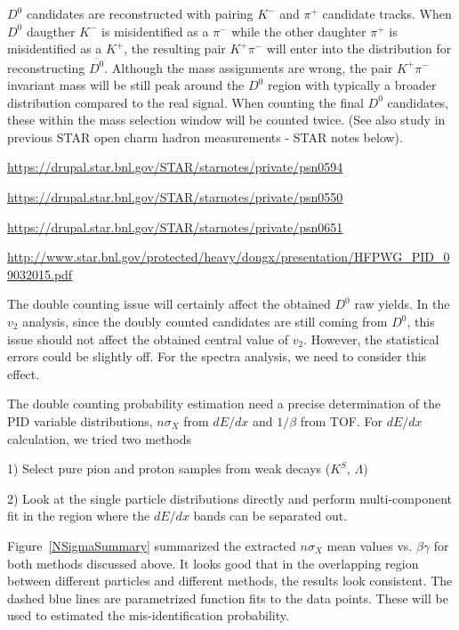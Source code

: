 $D^0$ candidates are reconstructed with pairing $K^-$ and $\pi^+$ candidate tracks. When $D^0$ daugther $K^-$ is misidentified as a $\pi^-$ while the other daughter $\pi^+$ is misidentified as a $K^+$, the resulting pair $K^+\pi^-$ will enter into the distribution for reconstructing $\overline{D^0}$. Although the mass assignments are wrong, the pair $K^+\pi^-$ invariant mass will be still peak around the $D^0$ region with typically a broader distribution compared to the real signal. When counting the final $D^0$ candidates, these within the mass selection window will be counted twice. (See also study in previous STAR open charm hadron measurements - STAR notes below).

\url{https://drupal.star.bnl.gov/STAR/starnotes/private/psn0594}

\url{https://drupal.star.bnl.gov/STAR/starnotes/private/psn0550}

\url{https://drupal.star.bnl.gov/STAR/starnotes/private/psn0651}

\url{http://www.star.bnl.gov/protected/heavy/dongx/presentation/HFPWG_PID_09032015.pdf}

The double counting issue will certainly affect the obtained $D^0$ raw yields. In the $v_2$ analysis, since the doubly counted candidates are still coming from $D^0$, this issue should not affect the obtained central value of $v_2$. However, the statistical errors could be slightly off. For the spectra analysis, we need to consider this effect.

The double counting probability estimation need a precise determination of the PID variable distributions, $n\sigma_X$ from $dE/dx$ and $1/\beta$ from TOF. For $dE/dx$ calculation, we tried two methods

1) Select pure pion and proton samples from weak decays ($K^{S}$, $\Lambda$)

2) Look at the single particle distributions directly and perform multi-component fit in the region where the $dE/dx$ bands can be separated out.

Figure~\ref{NSigmaSummary} summarized the extracted $n\sigma_{X}$ mean values vs. $\beta\gamma$ for both methods discussed above. It looks good that in the overlapping region between different particles and different methods, the results look consistent. The dashed blue lines are parametrized function fits to the data points. These will be used to estimated the mis-identification probability.

